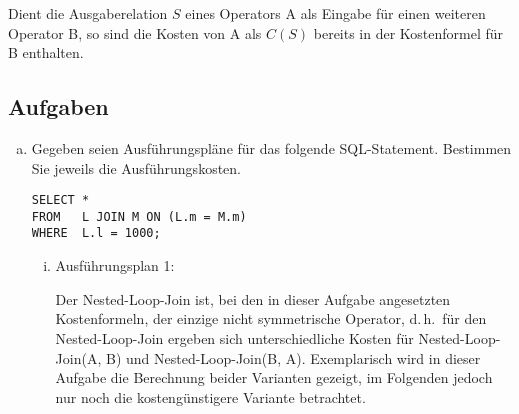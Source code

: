 Dient die Ausgaberelation $S$ eines Operators A als Eingabe für einen weiteren Operator B, so sind die Kosten von A als $C(S)$ bereits in der Kostenformel für B enthalten.


\subsection*{Aufgaben}

\begin{enumerate}[a)]

	\item Gegeben seien Ausführungspläne für das folgende SQL-Statement.
	Bestimmen Sie jeweils die Ausführungskosten.

	\begin{lstlisting}
SELECT *
FROM   L JOIN M ON (L.m = M.m)
WHERE  L.l = 1000;
	\end{lstlisting}

	\begin{enumerate}[i)]

\item
Ausführungsplan 1:


\begin{solution}
Der Nested-Loop-Join ist, bei den in dieser Aufgabe angesetzten Kostenformeln, der einzige nicht symmetrische Operator, d.\,h.\ für den Nested-Loop-Join ergeben sich unterschiedliche Kosten für Nested-Loop-Join(A, B) und Nested-Loop-Join(B, A).
Exemplarisch wird in dieser Aufgabe die Berechnung beider Varianten gezeigt, im Folgenden jedoch nur noch die kostengünstigere Variante betrachtet.


\end{solution}
\end{enumerate}
\end{enumerate}
